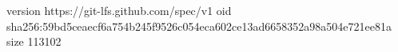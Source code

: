 version https://git-lfs.github.com/spec/v1
oid sha256:59bd5ceaecf6a754b245f9526c054eca602ce13ad6658352a98a504e721ee81a
size 113102
